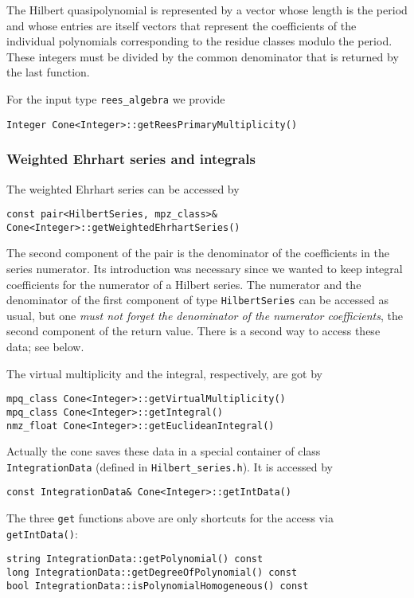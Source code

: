 \documentclass[12pt,a4paper]{scrartcl}
\theoremstyle{definition}
\begin{document}
\begin{small}
The Hilbert quasipolynomial is represented by a vector whose length is the period and whose entries are itself vectors that represent the coefficients of the individual polynomials corresponding to the residue classes modulo the period. These integers must be divided by the common denominator that is returned by the last function.

For the input type \verb|rees_algebra| we provide
\begin{Verbatim}
Integer Cone<Integer>::getReesPrimaryMultiplicity()
\end{Verbatim}

\subsubsection{Weighted Ehrhart series and integrals}

The weighted Ehrhart series can be accessed by
\begin{Verbatim}
const pair<HilbertSeries, mpz_class>& Cone<Integer>::getWeightedEhrhartSeries()
\end{Verbatim}
The second component of the pair is the denominator of the coefficients in the series numerator. Its introduction was necessary since we wanted to keep integral coefficients for the numerator of a Hilbert series. The numerator and the denominator of the first component of type \verb|HilbertSeries| can be accessed as usual, but one \emph{must not forget the denominator of the numerator coefficients}, the second component of the return value. There is a second way to access these data; see below.

The virtual multiplicity and the integral, respectively, are got by
\begin{Verbatim}
mpq_class Cone<Integer>::getVirtualMultiplicity()
mpq_class Cone<Integer>::getIntegral()
nmz_float Cone<Integer>::getEuclideanIntegral()
\end{Verbatim}

Actually the cone saves these data in a special container of class \verb|IntegrationData| (defined in \verb|Hilbert_series.h|). It is accessed by
\begin{Verbatim}
const IntegrationData& Cone<Integer>::getIntData()
\end{Verbatim}
The three \verb|get| functions above are only shortcuts for the access via \verb|getIntData()|:
\begin{Verbatim}
string IntegrationData::getPolynomial() const
long IntegrationData::getDegreeOfPolynomial() const
bool IntegrationData::isPolynomialHomogeneous() const


\end{Verbatim}
\end{small}
\end{document}

